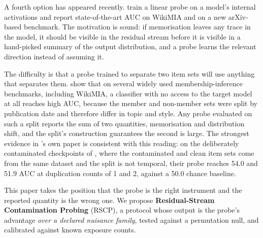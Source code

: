 \documentclass[10pt,twocolumn,letterpaper]{article}
\begin{document}
A fourth option has appeared recently. \citet{liu2024probing} train a linear probe on a model's internal activations and report state-of-the-art AUC on WikiMIA and on a new arXiv-based benchmark. The motivation is sound: if memorisation leaves any trace in the model, it should be visible in the residual stream before it is visible in a hand-picked summary of the output distribution, and a probe learns the relevant direction instead of assuming it.

The difficulty is that a probe trained to separate two item sets will use anything that separates them. \citet{das2024blind} show that on several widely used membership-inference benchmarks, including WikiMIA, a classifier with no access to the target model at all reaches high AUC, because the member and non-member sets were split by publication date and therefore differ in topic and style. Any probe evaluated on such a split reports the sum of two quantities, memorisation and distribution shift, and the split's construction guarantees the second is large. The strongest evidence in \citeauthor{liu2024probing}'s own paper is consistent with this reading: on the deliberately contaminated checkpoints of \citet{oren2024proving}, where the contaminated and clean item sets come from the same dataset and the split is not temporal, their probe reaches 54.0 and 51.9 AUC at duplication counts of 1 and 2, against a 50.0 chance baseline.

This paper takes the position that the probe is the right instrument and the reported quantity is the wrong one. We propose \textbf{Residual-Stream Contamination Probing} (RSCP), a protocol whose output is the probe's advantage \emph{over a declared nuisance family}, tested against a permutation null, and calibrated against known exposure counts.
\end{document}
